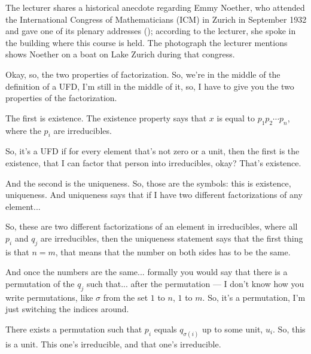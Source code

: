 \begin{insight}
The lecturer shares a historical anecdote regarding Emmy Noether, who attended the International Congress of Mathematicians (ICM) in Zurich in September 1932 and gave one of its plenary addresses (); according to the lecturer, she spoke in the building where this course is held. The photograph the lecturer mentions shows Noether on a boat on Lake Zurich during that congress.
\end{insight}

\begin{speech}[00:13:40 - 00:15:05]
Okay, so, the two properties of factorization. So, we're in the middle of the definition of a UFD, I'm still in the middle of it, so, I have to give you the two properties of the factorization.

The first is existence.  The existence property says that $x$  is equal to $p_1 p_2 \cdots p_n$, where  the $p_i$ are irreducibles.

So, it's a UFD if for every element that's not zero or a unit, then the first is the existence, that I can factor that person into irreducibles, okay? That's existence.

And the second is the uniqueness.  So, those are the symbols: this is existence, uniqueness. And uniqueness says that if I have two different factorizations of any element... 

So, these are two different factorizations of an element in irreducibles, where all $p_i$ and $q_j$  are irreducibles, then  the uniqueness statement says that the first thing is that $n = m$,  that means that the number on both sides has to be the same.

And once the numbers are the same... formally you would say that there is a permutation  of the $q_j$ such that... after the permutation --- I don't know how you write permutations, like $\sigma$ from the set $1$ to $n$,  $1$ to $m$. So, it's a permutation, I'm just switching the indices around.

There exists a permutation such that $p_i$  equals $q_{\sigma(i)}$ up to some unit, $u_i$. So, this is a unit.  This one's irreducible,  and that one's irreducible. 
\end{speech}

